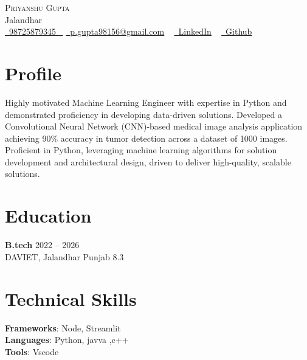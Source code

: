 \documentclass[letterpaper,11pt]{article}
\begin{document}

\begin{center}
    {\Huge \scshape Priyanshu Gupta} \\ \vspace{1pt}
    Jalandhar \\ \vspace{1pt}
    \small 
    \small \href{98725879345}{ \raisebox{-0.1\height}\faPhone\ \underline{98725879345} ~} 
    \href{p.gupta98156@gmail.com}{\raisebox{-0.2\height}\faEnvelope\  \underline{p.gupta98156@gmail.com}} ~
    \href{https://www.linkedin.com/in/priyanshu-gupta18/}{\raisebox{-0.2\height}\faLinkedinSquare\ \underline{LinkedIn}}  ~
    \href{https://github.com/Priyanshu98156/MedVision}{\raisebox{-0.2\height}\faGithub\ \underline{Github}} ~
\end{center}
% 

\section{Profile}
Highly motivated Machine Learning Engineer with expertise in Python and demonstrated proficiency in developing data-driven solutions. Developed a Convolutional Neural Network (CNN)-based medical image analysis application achieving 90\% accuracy in tumor detection across a dataset of 1000 images.  Proficient in Python, leveraging machine learning algorithms for solution development and architectural design, driven to deliver high-quality, scalable solutions.\\ 


\section*{Education}
\textbf{B.tech} \hfill 2022 -- 2026 \\[2pt]
DAVIET, Jalandhar Punjab \hfill 8.3 \\[6pt]






\section*{Technical Skills}
\textbf{Frameworks}: Node, Streamlit \\[4pt]
\textbf{Languages}: Python, javva ,c++ \\[4pt]
\textbf{Tools}: Vscode \\[4pt]
\end{document}
